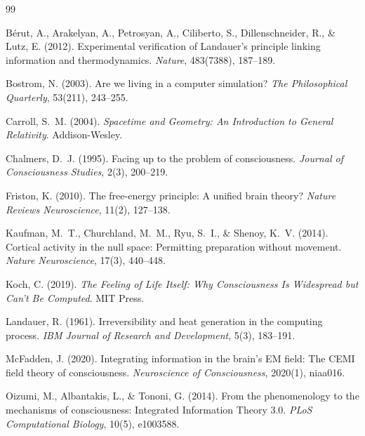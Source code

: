 \documentclass[12pt,a4paper]{article}
\begin{document}
\begin{thebibliography}{99}

B\'{e}rut, A., Arakelyan, A., Petrosyan, A., Ciliberto, S.,
  Dillenschneider, R., \& Lutz, E. (2012).
\newblock Experimental verification of {L}andauer's principle
  linking information and thermodynamics.
\newblock \emph{Nature}, 483(7388), 187--189.

Bostrom, N. (2003).
\newblock Are we living in a computer simulation?
\newblock \emph{The Philosophical Quarterly}, 53(211), 243--255.

Carroll, S.~M. (2004).
\newblock \emph{Spacetime and Geometry: An Introduction to
  General Relativity}.
\newblock Addison-Wesley.

Chalmers, D.~J. (1995).
\newblock Facing up to the problem of consciousness.
\newblock \emph{Journal of Consciousness Studies}, 2(3),
  200--219.

Friston, K. (2010).
\newblock The free-energy principle: A unified brain theory?
\newblock \emph{Nature Reviews Neuroscience}, 11(2), 127--138.

Kaufman, M.~T., Churchland, M.~M., Ryu, S.~I., \&
  Shenoy, K.~V. (2014).
\newblock Cortical activity in the null space: Permitting
  preparation without movement.
\newblock \emph{Nature Neuroscience}, 17(3), 440--448.

Koch, C. (2019).
\newblock \emph{The Feeling of Life Itself: Why Consciousness
  Is Widespread but Can't Be Computed}.
\newblock MIT Press.

Landauer, R. (1961).
\newblock Irreversibility and heat generation in the computing
  process.
\newblock \emph{IBM Journal of Research and Development}, 5(3),
  183--191.

McFadden, J. (2020).
\newblock Integrating information in the brain's {EM} field:
  The {CEMI} field theory of consciousness.
\newblock \emph{Neuroscience of Consciousness}, 2020(1),
  niaa016.

Oizumi, M., Albantakis, L., \& Tononi, G. (2014).
\newblock From the phenomenology to the mechanisms of
  consciousness: {I}ntegrated {I}nformation {T}heory 3.0.
\newblock \emph{PLoS Computational Biology}, 10(5), e1003588.


\end{thebibliography}
\end{document}
